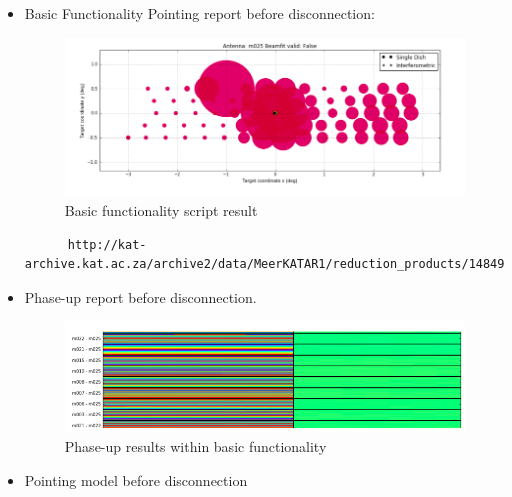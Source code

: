 \documentclass{article}
\begin{document}
{\begin{appendices}
\begin{itemize}
\begin{figure}[H]
	  	\caption{Tilt meter disconnect error}
	  	\label{fig:tilt1}
	  \end{figure}
	  
	  
	  \item Basic Functionality Pointing report before disconnection:
	  \begin{figure}[H]
	  	\centering
	  	\includegraphics[scale=0.33]{m025_basic.png}
	  	
	  	\caption{Basic functionality script result}
	  	\label{fig:tilt2}
	  \end{figure}
	  
	  
	  \begin{lstlisting}
	  http://kat-archive.kat.ac.za/archive2/data/MeerKATAR1/reduction_products/1484996817/obs_report_1484994649.h5.html
	  \end{lstlisting}
	  
	  
	  
	  
	  
	  
	  \item Phase-up report before disconnection.
	   \begin{figure}[H]
	  	\centering
	  	\includegraphics[scale=0.33]{m025_phase.png}
	  	
	  	\caption{Phase-up results within basic functionality}
	  	\label{fig:tilt3}
	  \end{figure}
	  
	  \item Pointing model before disconnection
	 

\end{itemize}
\end{appendices}}
\end{document}
